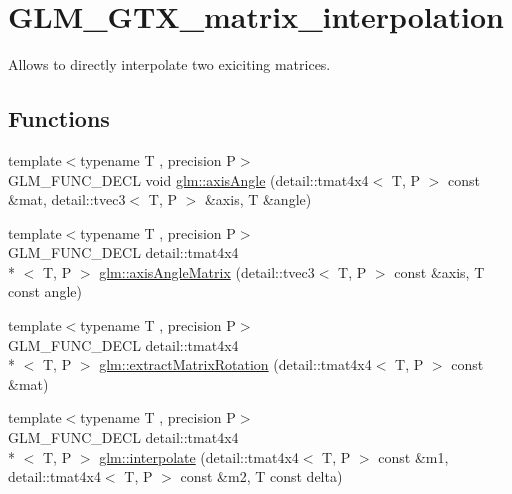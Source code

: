 \hypertarget{group__gtx__matrix__interpolation}{\section{G\-L\-M\-\_\-\-G\-T\-X\-\_\-matrix\-\_\-interpolation}
\label{group__gtx__matrix__interpolation}
}


Allows to directly interpolate two exiciting matrices.  


\subsection*{Functions}
\begin{DoxyCompactItemize}
\item 
{\footnotesize template$<$typename T , precision P$>$ }\\G\-L\-M\-\_\-\-F\-U\-N\-C\-\_\-\-D\-E\-C\-L void \hyperlink{group__gtx__matrix__interpolation_gadf049332345bf754b63fe24a914f8fac}{glm\-::axis\-Angle} (detail\-::tmat4x4$<$ T, P $>$ const \&mat, detail\-::tvec3$<$ T, P $>$ \&axis, T \&angle)
\item 
{\footnotesize template$<$typename T , precision P$>$ }\\G\-L\-M\-\_\-\-F\-U\-N\-C\-\_\-\-D\-E\-C\-L detail\-::tmat4x4\\*
$<$ T, P $>$ \hyperlink{group__gtx__matrix__interpolation_gafc6982aa7c8e8198b21f038f51fc4b90}{glm\-::axis\-Angle\-Matrix} (detail\-::tvec3$<$ T, P $>$ const \&axis, T const angle)
\item 
{\footnotesize template$<$typename T , precision P$>$ }\\G\-L\-M\-\_\-\-F\-U\-N\-C\-\_\-\-D\-E\-C\-L detail\-::tmat4x4\\*
$<$ T, P $>$ \hyperlink{group__gtx__matrix__interpolation_gacb1e3e76c1710d89a1852d87d58c021e}{glm\-::extract\-Matrix\-Rotation} (detail\-::tmat4x4$<$ T, P $>$ const \&mat)
\item 
{\footnotesize template$<$typename T , precision P$>$ }\\G\-L\-M\-\_\-\-F\-U\-N\-C\-\_\-\-D\-E\-C\-L detail\-::tmat4x4\\*
$<$ T, P $>$ \hyperlink{group__gtx__matrix__interpolation_gad7dbb702234767be1b4d3c191a2327ac}{glm\-::interpolate} (detail\-::tmat4x4$<$ T, P $>$ const \&m1, detail\-::tmat4x4$<$ T, P $>$ const \&m2, T const delta)
\end{DoxyCompactItemize}


